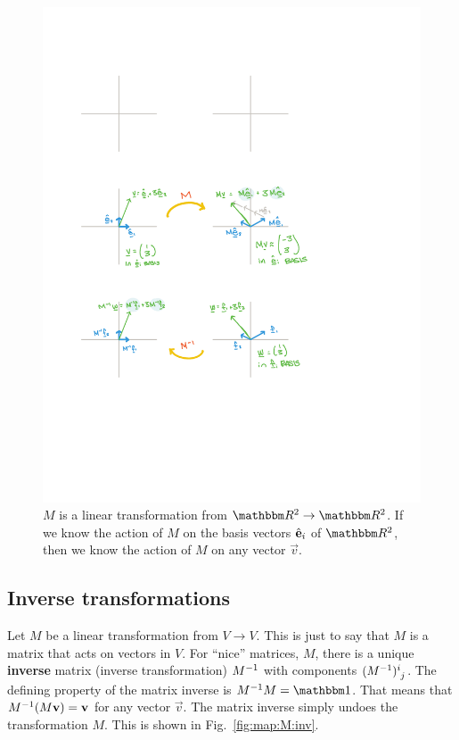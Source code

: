 \documentclass[12pt]{article}
\begin{document}
\begin{figure}[tb]
    \centering
    \includegraphics[width=.8\textwidth]{figures/maps_M.pdf}
    \caption{$M$ is a linear transformation from $\RR ^2\to\RR ^2$. If we know the action of $M$ on the basis vectors $\hat{\mathbf{e}}_i$ of $\RR ^2$, then we know the action of $M$ on any vector $\vec{v}$.}
    \label{fig:map:M}
\end{figure}




\subsection{Inverse transformations}


Let $M$ be a linear transformation from $V\to V$. This is just to say that $M$ is a matrix that acts on vectors in $V$. For ``nice'' matrices, $M$, there is a unique \textbf{inverse} matrix (inverse transformation) $M^{-1}$ with components $(M\inv)\aij{i}{j}$. The defining property of the matrix inverse is $M\inv M = \one $. That means that $M^{-1}(M\mathbf{v})=\mathbf{v}$ for any vector $\vec{v}$. The matrix inverse simply undoes the transformation $M$. This is shown in Fig.~\ref{fig:map:M:inv}. 
\end{document}
